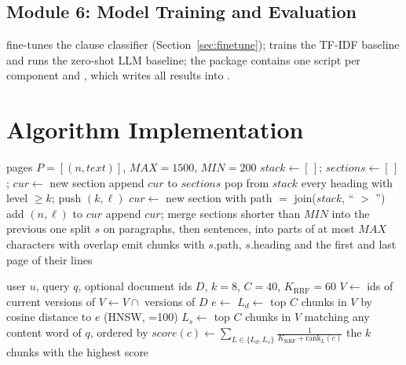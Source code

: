 \subsection{Module 6: Model Training and Evaluation}
 fine-tunes the clause classifier (Section~\ref{sec:finetune});
 trains the TF-IDF baseline and runs the zero-shot LLM baseline; the
 package contains one script per component and , which writes
all results into .

\section{Algorithm Implementation}

\begin{algorithm}[H]
\caption{Structure-aware chunking}\label{alg:chunk}
\begin{algorithmic}[1]
\Require pages $P = [(n, \mathit{text})]$, $\mathit{MAX}=1500$, $\mathit{MIN}=200$
\State $\mathit{stack} \gets [\,]$; $\mathit{sections} \gets [\,]$; $\mathit{cur} \gets$ new section
    \State append $\mathit{cur}$ to $\mathit{sections}$
    \State pop from $\mathit{stack}$ every heading with level $\geq k$; push $(k,\ell)$
    \State $\mathit{cur} \gets$ new section with path $=$ join($\mathit{stack}$, `` $>$ '')
  \Else
    \State add $(n,\ell)$ to $\mathit{cur}$
  \EndIf
\EndFor
\State append $\mathit{cur}$; merge sections shorter than $\mathit{MIN}$ into the previous one
  \State split $s$ on paragraphs, then sentences, into parts of at most $\mathit{MAX}$ characters with overlap
  \State emit chunks with $s$.path, $s$.heading and the first and last page of their lines
\EndFor
\end{algorithmic}
\end{algorithm}

\begin{algorithm}[H]
\caption{Permission-filtered hybrid retrieval with Reciprocal Rank Fusion}\label{alg:rrf}
\begin{algorithmic}[1]
\Require user $u$, query $q$, optional document ids $D$, $k=8$, $C=40$, $K_{\mathrm{RRF}}=60$
\State $V \gets$ ids of current versions of  
 $V \gets V \cap$ versions of $D$ \EndIf {}
\State $e \gets$ 
\State $L_d \gets$ top $C$ chunks in $V$ by cosine distance to $e$ (HNSW, =100)
\State $L_s \gets$ top $C$ chunks in $V$ matching any content word of $q$, ordered by 
  \State $\mathit{score}(c) \gets \sum_{L \in \{L_d, L_s\}} \frac{1}{K_{\mathrm{RRF}} + \mathrm{rank}_L(c)}$
\EndFor
\State \Return the $k$ chunks with the highest score
\end{algorithmic}
\end{algorithm}


